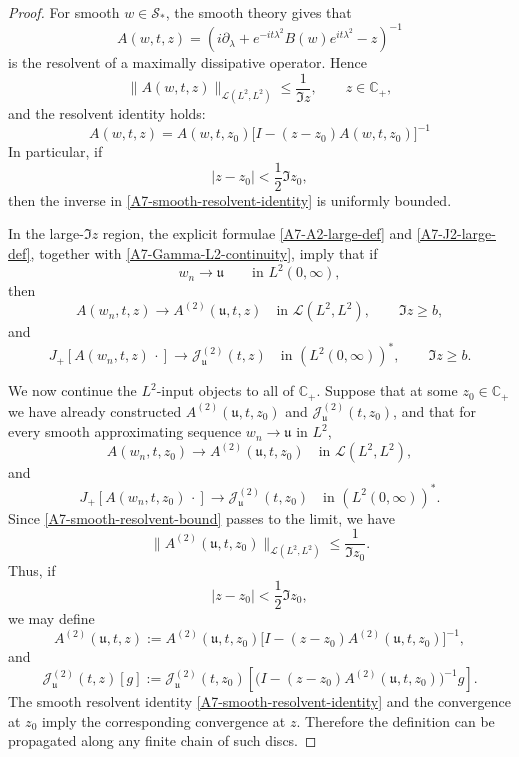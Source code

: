 \documentclass[10pt,a4paper]{amsart}
\begin{document}
\begin{proof}
For smooth \(w\in\mathcal S_*\), the smooth theory gives that
\[
A(w,t,z)
=
\left(
i\partial_\lambda+
e^{-it\lambda^2}B(w)e^{it\lambda^2}
-z
\right)^{-1}
\]
is the resolvent of a maximally dissipative operator. Hence
\begin{equation}
\label{A7-smooth-resolvent-bound}
\|A(w,t,z)\|_{\mathcal L(L^2,L^2)}
\le
\frac1{\Im z},
\qquad z\in\mathbb C_+,
\end{equation}
and the resolvent identity holds:
\begin{equation}
\label{A7-smooth-resolvent-identity}
A(w,t,z)
=
A(w,t,z_0)
\bigl[I-(z-z_0)A(w,t,z_0)\bigr]^{-1}
\end{equation}
In particular, if
\[
|z-z_0|<\frac12\Im z_0,
\]
then the inverse in \eqref{A7-smooth-resolvent-identity} is uniformly bounded.

In the large-\(\Im z\) region, the explicit formulae
\eqref{A7-A2-large-def} and \eqref{A7-J2-large-def}, together with
\eqref{A7-Gamma-L2-continuity}, imply that if
\[
w_n\to\mathfrak u
\qquad\text{in }L^2(0,\infty),
\]
then
\begin{equation}
\label{A7-A2-large-conv}
A(w_n,t,z)\to A^{(2)}(\mathfrak u,t,z)
\quad\text{in }\mathcal L(L^2,L^2),
\qquad \Im z\ge b,
\end{equation}
and
\begin{equation}
\label{A7-J2-large-conv}
J_+[A(w_n,t,z)\,\cdot]
\to
\mathcal J^{(2)}_{\mathfrak u}(t,z)
\quad\text{in }(L^2(0,\infty))^*,
\qquad \Im z\ge b.
\end{equation}

We now continue the \(L^2\)-input objects to all of \(\mathbb C_+\). Suppose that
at some \(z_0\in\mathbb C_+\) we have already constructed
\(A^{(2)}(\mathfrak u,t,z_0)\) and
\(\mathcal J^{(2)}_{\mathfrak u}(t,z_0)\), and that for every smooth
approximating sequence \(w_n\to\mathfrak u\) in \(L^2\),
\[
A(w_n,t,z_0)\to A^{(2)}(\mathfrak u,t,z_0)
\quad\text{in }\mathcal L(L^2,L^2),
\]
and
\[
J_+[A(w_n,t,z_0)\,\cdot]
\to
\mathcal J^{(2)}_{\mathfrak u}(t,z_0)
\quad\text{in }(L^2(0,\infty))^*.
\]
Since \eqref{A7-smooth-resolvent-bound} passes to the limit, we have
\[
\|A^{(2)}(\mathfrak u,t,z_0)\|_{\mathcal L(L^2,L^2)}
\le
\frac1{\Im z_0}.
\]
Thus, if
\[
|z-z_0|<\frac12\Im z_0,
\]
we may define
\begin{equation}
\label{A7-A2-continuation}
A^{(2)}(\mathfrak u,t,z)
:=
A^{(2)}(\mathfrak u,t,z_0)
\bigl[
I-(z-z_0)A^{(2)}(\mathfrak u,t,z_0)
\bigr]^{-1},
\end{equation}
and
\begin{equation}
\label{A7-J2-continuation}
\mathcal J^{(2)}_{\mathfrak u}(t,z)[g]
:=
\mathcal J^{(2)}_{\mathfrak u}(t,z_0)
\left[
\bigl(
I-(z-z_0)A^{(2)}(\mathfrak u,t,z_0)
\bigr)^{-1}g
\right].
\end{equation}
The smooth resolvent identity \eqref{A7-smooth-resolvent-identity} and the
convergence at \(z_0\) imply the corresponding convergence at \(z\). Therefore
the definition can be propagated along any finite chain of such discs.


\end{proof}
\end{document}
